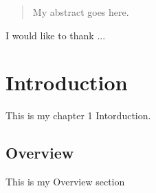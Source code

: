 %
%
\frontmatter  
%
%
\begin{abstract}      
My abstract goes here.
\end{abstract}
%
%
\begin{acknowledgements}
I would like to thank ...
\end{acknowledgements}
%
%
\mainmatter
%
%
%
%
%
\chapter{Introduction}
This is my chapter 1 Intorduction.
\section{Overview}
This is my Overview section
\newpage
